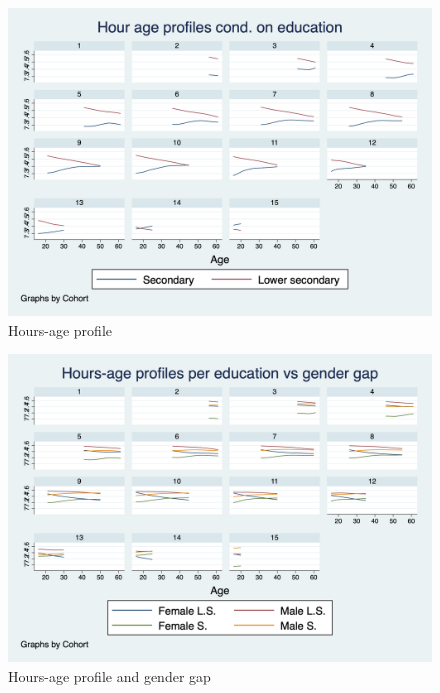 \documentclass[12pt]{article}
\begin{document}
\begin{figure}
    \centering
    \includegraphics[scale=0.4]{graph4.png}
    \caption{\label{fig:hours}Hours-age profile}
    
\end{figure}
\begin{figure}
    \centering
    \includegraphics[scale=0.4]{graph5.png}
    \caption{\label{fig:h_l_cohorts}Hours-age profile and gender gap}
\end{figure}
\end{document}
